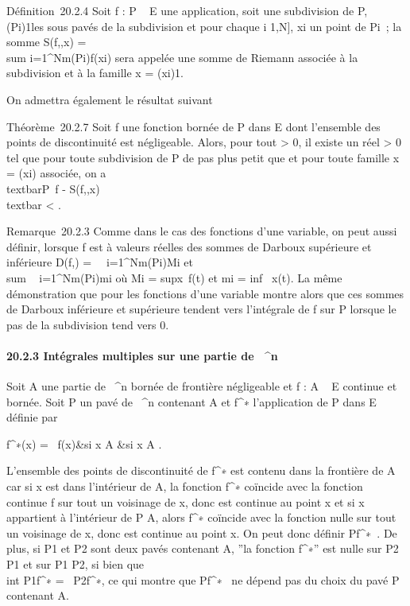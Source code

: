 Définition~20.2.4 Soit f : P \rightarrow~ E une application, soit \sigma une subdivision
de P, (Pi)1\leqi\leqN les sous pavés de la subdivision et
pour chaque i \in {[}1,N{]}, xi un point de Pi~; la
somme S(f,\sigma,x) =\ \\sum
 i=1^Nm(Pi)f(xi) sera appelée une
somme de Riemann associée à la subdivision \sigma et à la famille x =
(xi)1\leqi\leqN.

On admettra également le résultat suivant

Théorème~20.2.7 Soit f une fonction bornée de P dans E dont l'ensemble
des points de discontinuité est négligeable. Alors, pour tout \epsilon
\textgreater{} 0, il existe un réel \eta \textgreater{} 0 tel que pour
toute subdivision \sigma de P de pas plus petit que \eta et pour toute famille x
= (xi) associée, on a
\\textbar{}\int  P~f -
S(f,\sigma,x)\\textbar{} \textless{} \epsilon.

Remarque~20.2.3 Comme dans le cas des fonctions d'une variable, on peut
aussi définir, lorsque f est à valeurs réelles des sommes de Darboux
supérieure et inférieure D(f,\sigma) =\
\sum ~
i=1^Nm(Pi)Mi et
\\sum ~
i=1^Nm(Pi)mi où Mi
= supx\inPi~f(t) et
mi = inf~
x\inPif(t). La même démonstration que pour les fonctions
d'une variable montre alors que ces sommes de Darboux inférieure et
supérieure tendent vers l'intégrale de f sur P lorsque le pas de la
subdivision tend vers 0.

\paragraph{20.2.3 Intégrales multiples sur une partie de ~^n}

Soit A une partie de ~^n bornée de frontière négligeable et f
: A \rightarrow~ E continue et bornée. Soit P un pavé de \mathbb{R}~^n contenant A
et f^∗ l'application de P dans E définie par

 f^∗(x) = \left \
\cases f(x)&si x \in A  &si x \in A
 \right .

L'ensemble des points de discontinuité de f^∗ est contenu
dans la frontière de A car si x est dans l'intérieur de A, la fonction
f^∗ coïncide avec la fonction continue f sur tout un
voisinage de x, donc est continue au point x et si x appartient à
l'intérieur de P \diagdown A, alors f^∗ coïncide avec la fonction
nulle sur tout un voisinage de x, donc est continue au point x. On peut
donc définir \int  Pf^∗~. De
plus, si P1 et P2 sont deux pavés contenant A, ''la
fonction f^∗'' est nulle sur P2 \diagdown P1 et
sur P1 \diagdown P2, si bien que \\int
 P1f^∗ =\int ~
P2f^∗, ce qui montre que
\int  Pf^∗~ ne dépend pas du
choix du pavé P contenant A.

